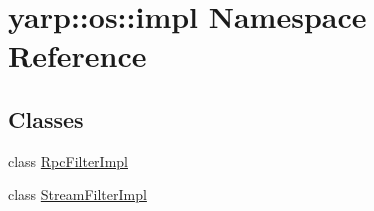 \hypertarget{namespaceyarp_1_1os_1_1impl}{
\section{yarp::os::impl Namespace Reference}
\label{namespaceyarp_1_1os_1_1impl}
}
\subsection*{Classes}
\begin{DoxyCompactItemize}
\item 
class \hyperlink{classyarp_1_1os_1_1impl_1_1_rpc_filter_impl}{RpcFilterImpl}
\item 
class \hyperlink{classyarp_1_1os_1_1impl_1_1_stream_filter_impl}{StreamFilterImpl}
\end{DoxyCompactItemize}
